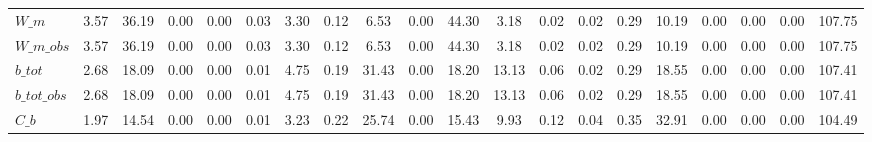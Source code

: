 \begin{center}
\begin{longtable}{lccccccccccccccccccc}
$W\_m                       $	 & 	                3.57	 & 	               36.19	 & 	                0.00	 & 	                0.00	 & 	                0.03	 & 	                3.30	 & 	                0.12	 & 	                6.53	 & 	                0.00	 & 	               44.30	 & 	                3.18	 & 	                0.02	 & 	                0.02	 & 	                0.29	 & 	               10.19	 & 	                0.00	 & 	                0.00	 & 	                0.00	 & 	              107.75 \\ 
$W\_m\_obs                  $	 & 	                3.57	 & 	               36.19	 & 	                0.00	 & 	                0.00	 & 	                0.03	 & 	                3.30	 & 	                0.12	 & 	                6.53	 & 	                0.00	 & 	               44.30	 & 	                3.18	 & 	                0.02	 & 	                0.02	 & 	                0.29	 & 	               10.19	 & 	                0.00	 & 	                0.00	 & 	                0.00	 & 	              107.75 \\ 
$b\_tot                     $	 & 	                2.68	 & 	               18.09	 & 	                0.00	 & 	                0.00	 & 	                0.01	 & 	                4.75	 & 	                0.19	 & 	               31.43	 & 	                0.00	 & 	               18.20	 & 	               13.13	 & 	                0.06	 & 	                0.02	 & 	                0.29	 & 	               18.55	 & 	                0.00	 & 	                0.00	 & 	                0.00	 & 	              107.41 \\ 
$b\_tot\_obs                $	 & 	                2.68	 & 	               18.09	 & 	                0.00	 & 	                0.00	 & 	                0.01	 & 	                4.75	 & 	                0.19	 & 	               31.43	 & 	                0.00	 & 	               18.20	 & 	               13.13	 & 	                0.06	 & 	                0.02	 & 	                0.29	 & 	               18.55	 & 	                0.00	 & 	                0.00	 & 	                0.00	 & 	              107.41 \\ 
$C\_b                       $	 & 	                1.97	 & 	               14.54	 & 	                0.00	 & 	                0.00	 & 	                0.01	 & 	                3.23	 & 	                0.22	 & 	               25.74	 & 	                0.00	 & 	               15.43	 & 	                9.93	 & 	                0.12	 & 	                0.04	 & 	                0.35	 & 	               32.91	 & 	                0.00	 & 	                0.00	 & 	                0.00	 & 	              104.49 \\ 

\end{longtable}
\end{center}
